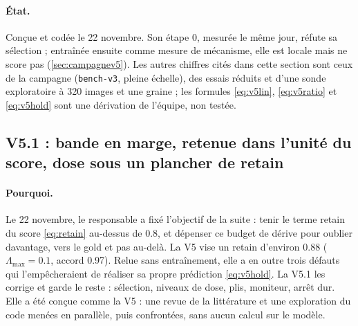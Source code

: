 \documentclass[11pt,a4paper]{article}
\newcommand{\code}[1]{\texttt{#1}}
\begin{document}
\paragraph{État.} Conçue et codée le 22 novembre. Son étape 0, mesurée le même jour, réfute sa
sélection ; entraînée ensuite comme mesure de mécanisme, elle est locale mais ne score pas
(\cref{sec:campagnev5}). Les autres chiffres cités dans cette section sont ceux de la campagne (\code{bench-v3}, pleine échelle), des essais réduits et d'une
sonde exploratoire à 320 images et une graine ; les formules \eqref{eq:v5lin}, \eqref{eq:v5ratio} et
\eqref{eq:v5hold} sont une dérivation de l'équipe, non testée.

\subsection{V5.1 : bande en marge, retenue dans l'unité du score, dose sous un plancher de retain}\label{sec:v51}
\paragraph{Pourquoi.} Le 22 novembre, le responsable a fixé l'objectif de la suite : tenir le terme
retain du score \eqref{eq:retain} au-dessus de \num{0.8}, et dépenser ce budget de dérive pour oublier
davantage, vers le gold et pas au-delà. La V5 vise un retain d'environ \num{0.88}
($\Lambda_{\max}=\num{0.1}$, accord \num{0.97}). Relue sans entraînement, elle a en outre trois défauts
qui l'empêcheraient de réaliser sa propre prédiction \eqref{eq:v5hold}. La V5.1 les corrige et garde
le reste : sélection, niveaux de dose, plis, moniteur, arrêt dur. Elle a été conçue comme la V5 : une
revue de la littérature et une exploration du code menées en parallèle, puis confrontées, sans aucun
calcul sur le modèle.
\end{document}
